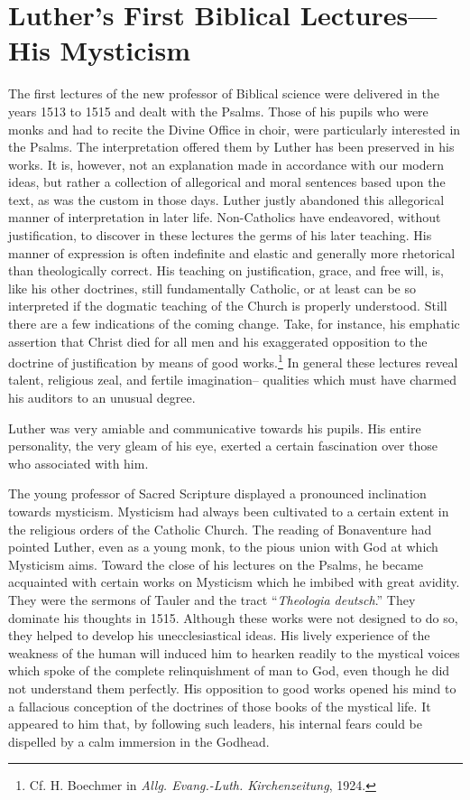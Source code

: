 \section{Luther’s First Biblical Lectures—His Mysticism}

The first lectures of the new professor of Biblical science were
delivered in the years 1513 to 1515 and dealt with the Psalms.
Those of his pupils who were monks and had to recite the Divine
Office in choir, were particularly interested in the Psalms. The interpretation
offered them by Luther has been preserved in his works. It is, however, not an explanation made in accordance with
our modern ideas, but rather a collection of allegorical and moral
sentences based upon the text, as was the custom in those days. Luther
justly abandoned this allegorical manner of interpretation in later
life. Non-Catholics have endeavored, without justification, to discover
in these lectures the germs of his later teaching. His manner
of expression is often indefinite and elastic and generally more rhetorical
than theologically correct. His teaching on justification,
grace, and free will, is, like his other doctrines, still fundamentally
Catholic, or at least can be so interpreted if the dogmatic teaching
of the Church is properly understood. Still there are a few indications
of the coming change. Take, for instance, his emphatic
assertion that Christ died for all men and his exaggerated opposition
to the doctrine of justification by means of good works.\footnote
{Cf. H. Boechmer in \textit{Allg. Evang.-Luth. Kirchenzeitung}, 1924.}
In general
these lectures reveal talent, religious zeal, and fertile imagination--
qualities which must have charmed his auditors to an unusual degree.

Luther was very amiable and communicative towards his pupils.
His entire personality, the very gleam of his eye, exerted a certain
fascination over those who associated with him.

The young professor of Sacred Scripture displayed a pronounced
inclination towards mysticism. Mysticism had always been cultivated
to a certain extent in the religious orders of the Catholic Church.
The reading of Bonaventure had pointed Luther, even as a young
monk, to the pious union with God at which Mysticism aims. Toward
the close of his lectures on the Psalms, he became acquainted with
certain works on Mysticism which he imbibed with great avidity.
They were the sermons of Tauler and the tract “\textit{Theologia deutsch}.”
They dominate his thoughts in 1515. Although these works were not
designed to do so, they helped to develop his unecclesiastical ideas.
His lively experience of the weakness of the human will induced him
to hearken readily to the mystical voices which spoke of the complete
relinquishment of man to God, even though he did not understand
them perfectly. His opposition to good works opened his mind to a
fallacious conception of the doctrines of those books of the mystical
life. It appeared to him that, by following such leaders, his internal
fears could be dispelled by a calm immersion in the Godhead.

